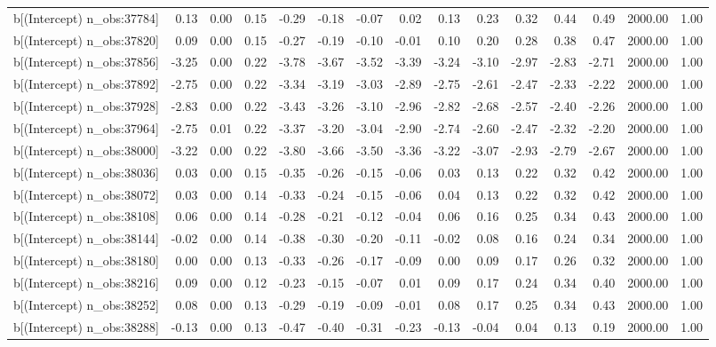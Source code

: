 \begin{table}[ht]
\begin{tabular}{rrrrrrrrrrrrrrr}
  b[(Intercept) n\_obs:37784] & 0.13 & 0.00 & 0.15 & -0.29 & -0.18 & -0.07 & 0.02 & 0.13 & 0.23 & 0.32 & 0.44 & 0.49 & 2000.00 & 1.00 \\ 
  b[(Intercept) n\_obs:37820] & 0.09 & 0.00 & 0.15 & -0.27 & -0.19 & -0.10 & -0.01 & 0.10 & 0.20 & 0.28 & 0.38 & 0.47 & 2000.00 & 1.00 \\ 
  b[(Intercept) n\_obs:37856] & -3.25 & 0.00 & 0.22 & -3.78 & -3.67 & -3.52 & -3.39 & -3.24 & -3.10 & -2.97 & -2.83 & -2.71 & 2000.00 & 1.00 \\ 
  b[(Intercept) n\_obs:37892] & -2.75 & 0.00 & 0.22 & -3.34 & -3.19 & -3.03 & -2.89 & -2.75 & -2.61 & -2.47 & -2.33 & -2.22 & 2000.00 & 1.00 \\ 
  b[(Intercept) n\_obs:37928] & -2.83 & 0.00 & 0.22 & -3.43 & -3.26 & -3.10 & -2.96 & -2.82 & -2.68 & -2.57 & -2.40 & -2.26 & 2000.00 & 1.00 \\ 
  b[(Intercept) n\_obs:37964] & -2.75 & 0.01 & 0.22 & -3.37 & -3.20 & -3.04 & -2.90 & -2.74 & -2.60 & -2.47 & -2.32 & -2.20 & 2000.00 & 1.00 \\ 
  b[(Intercept) n\_obs:38000] & -3.22 & 0.00 & 0.22 & -3.80 & -3.66 & -3.50 & -3.36 & -3.22 & -3.07 & -2.93 & -2.79 & -2.67 & 2000.00 & 1.00 \\ 
  b[(Intercept) n\_obs:38036] & 0.03 & 0.00 & 0.15 & -0.35 & -0.26 & -0.15 & -0.06 & 0.03 & 0.13 & 0.22 & 0.32 & 0.42 & 2000.00 & 1.00 \\ 
  b[(Intercept) n\_obs:38072] & 0.03 & 0.00 & 0.14 & -0.33 & -0.24 & -0.15 & -0.06 & 0.04 & 0.13 & 0.22 & 0.32 & 0.42 & 2000.00 & 1.00 \\ 
  b[(Intercept) n\_obs:38108] & 0.06 & 0.00 & 0.14 & -0.28 & -0.21 & -0.12 & -0.04 & 0.06 & 0.16 & 0.25 & 0.34 & 0.43 & 2000.00 & 1.00 \\ 
  b[(Intercept) n\_obs:38144] & -0.02 & 0.00 & 0.14 & -0.38 & -0.30 & -0.20 & -0.11 & -0.02 & 0.08 & 0.16 & 0.24 & 0.34 & 2000.00 & 1.00 \\ 
  b[(Intercept) n\_obs:38180] & 0.00 & 0.00 & 0.13 & -0.33 & -0.26 & -0.17 & -0.09 & 0.00 & 0.09 & 0.17 & 0.26 & 0.32 & 2000.00 & 1.00 \\ 
  b[(Intercept) n\_obs:38216] & 0.09 & 0.00 & 0.12 & -0.23 & -0.15 & -0.07 & 0.01 & 0.09 & 0.17 & 0.24 & 0.34 & 0.40 & 2000.00 & 1.00 \\ 
  b[(Intercept) n\_obs:38252] & 0.08 & 0.00 & 0.13 & -0.29 & -0.19 & -0.09 & -0.01 & 0.08 & 0.17 & 0.25 & 0.34 & 0.43 & 2000.00 & 1.00 \\ 
  b[(Intercept) n\_obs:38288] & -0.13 & 0.00 & 0.13 & -0.47 & -0.40 & -0.31 & -0.23 & -0.13 & -0.04 & 0.04 & 0.13 & 0.19 & 2000.00 & 1.00 \\ 

\end{tabular}
\end{table}
